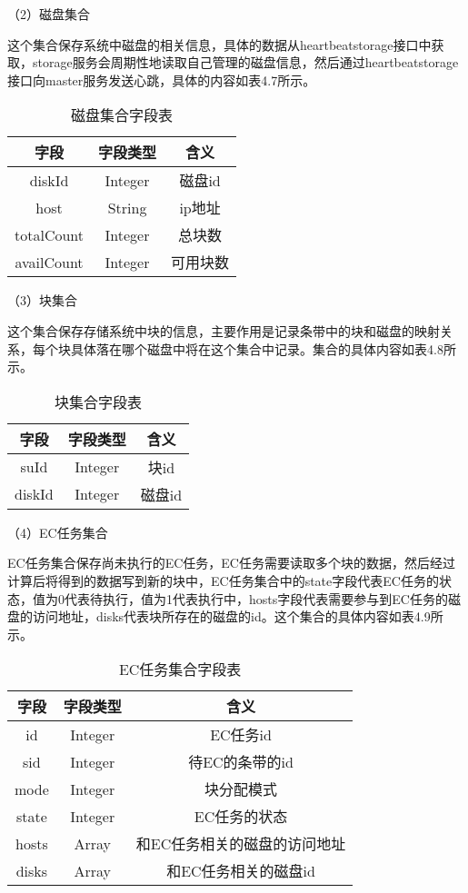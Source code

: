 （2）磁盘集合

这个集合保存系统中磁盘的相关信息，具体的数据从heartbeatstorage接口中获取，storage服务会周期性地读取自己管理的磁盘信息，然后通过heartbeatstorage接口向master服务发送心跳，具体的内容如表4.7所示。

\begin{table}[h]
  \centering
  \caption{磁盘集合字段表}
  \begin{tabular}{ccc}
    \toprule
    字段   & 字段类型   & 含义          \\
    \midrule
    diskId     & Integer   & 磁盘id    \\
    host       & String    & ip地址    \\
    totalCount & Integer   & 总块数    \\
    availCount & Integer   & 可用块数  \\
    \bottomrule
  \end{tabular}
\end{table}

（3）块集合

这个集合保存存储系统中块的信息，主要作用是记录条带中的块和磁盘的映射关系，每个块具体落在哪个磁盘中将在这个集合中记录。集合的具体内容如表4.8所示。

\begin{table}[h]
    \centering
    \caption{块集合字段表}
    \begin{tabular}{ccc}
      \toprule
      字段   & 字段类型   & 含义                   \\
      \midrule
      suId     & Integer   & 块id                 \\
      diskId   & Integer   & 磁盘id                \\
      \bottomrule
    \end{tabular}
\end{table}

（4）EC任务集合

EC任务集合保存尚未执行的EC任务，EC任务需要读取多个块的数据，然后经过计算后将得到的数据写到新的块中，EC任务集合中的state字段代表EC任务的状态，值为0代表待执行，值为1代表执行中，hosts字段代表需要参与到EC任务的磁盘的访问地址，disks代表块所存在的磁盘的id。这个集合的具体内容如表4.9所示。

\begin{table}[h]
    \centering
    \caption{EC任务集合字段表}
    \begin{tabular}{ccc}
      \toprule
      字段   & 字段类型   & 含义                          \\
      \midrule
      id     & Integer & EC任务id                 \\
      sid    & Integer & 待EC的条带的id                \\
      mode   & Integer & 块分配模式                 \\
      state  & Integer & EC任务的状态                \\
      hosts  & Array   & 和EC任务相关的磁盘的访问地址  \\
      disks  & Array   & 和EC任务相关的磁盘id         \\
      \bottomrule
    \end{tabular}
\end{table}

